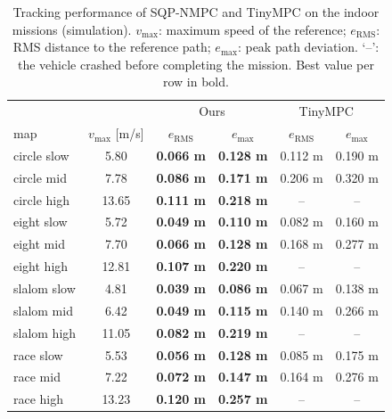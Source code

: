 \begin{table}[t]
  \centering
  \caption{Tracking performance of SQP-NMPC and TinyMPC on the indoor missions (simulation). $v_\mathrm{max}$: maximum speed of the reference; $e_\mathrm{RMS}$: RMS distance to the reference path; $e_\mathrm{max}$: peak path deviation. `--': the vehicle crashed before completing the mission. Best value per row in bold.}
  \label{tab:tinympc}
  \setlength{\tabcolsep}{4pt}
  \begin{tabular}{l|c|cc|cc}
    \toprule
    & & \multicolumn{2}{c|}{Ours} & \multicolumn{2}{c}{TinyMPC~\cite{nguyen2024tinympc}} \\
    map & $v_\mathrm{max}$ [m/s] & $e_\mathrm{RMS}$ & $e_\mathrm{max}$ & $e_\mathrm{RMS}$ & $e_\mathrm{max}$ \\
    \midrule
    circle slow & 5.80 & \textbf{0.066 m} & \textbf{0.128 m} & 0.112 m & 0.190 m \\
    circle mid & 7.78 & \textbf{0.086 m} & \textbf{0.171 m} & 0.206 m & 0.320 m \\
    circle high & 13.65 & \textbf{0.111 m} & \textbf{0.218 m} & -- & -- \\
    eight slow & 5.72 & \textbf{0.049 m} & \textbf{0.110 m} & 0.082 m & 0.160 m \\
    eight mid & 7.70 & \textbf{0.066 m} & \textbf{0.128 m} & 0.168 m & 0.277 m \\
    eight high & 12.81 & \textbf{0.107 m} & \textbf{0.220 m} & -- & -- \\
    slalom slow & 4.81 & \textbf{0.039 m} & \textbf{0.086 m} & 0.067 m & 0.138 m \\
    slalom mid & 6.42 & \textbf{0.049 m} & \textbf{0.115 m} & 0.140 m & 0.266 m \\
    slalom high & 11.05 & \textbf{0.082 m} & \textbf{0.219 m} & -- & -- \\
    race slow & 5.53 & \textbf{0.056 m} & \textbf{0.128 m} & 0.085 m & 0.175 m \\
    race mid & 7.22 & \textbf{0.072 m} & \textbf{0.147 m} & 0.164 m & 0.276 m \\
    race high & 13.23 & \textbf{0.120 m} & \textbf{0.257 m} & -- & -- \\
    \bottomrule
  \end{tabular}
\end{table}
